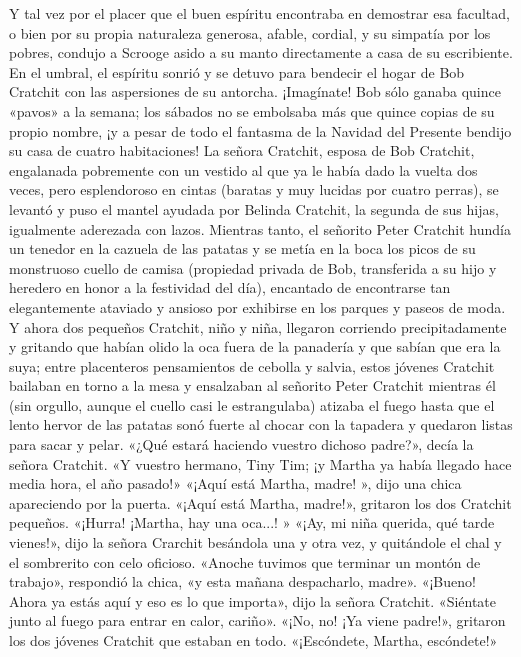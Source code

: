 \documentclass{novela}
\begin{document}
 Y tal vez por el placer que el buen espíritu encontraba en demostrar esa facultad, o bien por su propia naturaleza generosa, afable, cordial, y su simpatía por los pobres, condujo a Scrooge asido a su manto directamente a casa de su escribiente. En el umbral, el espíritu sonrió y se detuvo para bendecir el hogar de Bob Cratchit con las aspersiones de su antorcha. ¡Imagínate! Bob sólo ganaba quince «pavos» a la semana; los sábados no se embolsaba más que quince copias de su propio nombre, ¡y a pesar de todo el fantasma de la Navidad del Presente bendijo su casa de cuatro habitaciones!
 La señora Cratchit, esposa de Bob Cratchit, engalanada pobremente con un vestido al que ya le había dado la vuelta dos veces, pero esplendoroso en cintas (baratas y muy lucidas por cuatro perras), se levantó y puso el mantel ayudada por Belinda Cratchit, la segunda de sus hijas, igualmente aderezada con lazos. Mientras tanto, el señorito Peter Cratchit hundía un tenedor en la cazuela de las patatas y se metía en la boca los picos de su monstruoso cuello de camisa (propiedad privada de Bob, transferida a su hijo y heredero en honor a la festividad del día), encantado de encontrarse tan elegantemente ataviado y ansioso por exhibirse en los parques y paseos de moda. Y ahora dos pequeños Cratchit, niño y niña, llegaron corriendo precipitadamente y gritando que habían olido la oca fuera de la panadería y que sabían que era la suya; entre placenteros pensamientos de cebolla y salvia, estos jóvenes Cratchit bailaban en torno a la mesa y ensalzaban al señorito Peter Cratchit mientras él (sin orgullo, aunque el cuello casi le estrangulaba) atizaba el fuego hasta que el lento hervor de las patatas sonó fuerte al chocar con la tapadera y quedaron listas para sacar y pelar.
 «¿Qué estará haciendo vuestro dichoso padre?», decía la señora Cratchit. «Y vuestro hermano, Tiny Tim; ¡y Martha ya había llegado hace media hora, el año pasado!»
 «¡Aquí está Martha, madre! », dijo una chica apareciendo por la puerta.
 «¡Aquí está Martha, madre!», gritaron los dos Cratchit pequeños. «¡Hurra! ¡Martha, hay una oca...! »
 «¡Ay, mi niña querida, qué tarde vienes!», dijo la señora Crarchit besándola una y otra vez, y quitándole el chal y el sombrerito con celo oficioso.
 «Anoche tuvimos que terminar un montón de trabajo», respondió la chica, «y esta mañana despacharlo, madre». «¡Bueno! Ahora ya estás aquí y eso es lo que importa», dijo la señora Cratchit. «Siéntate junto al fuego para entrar en calor, cariño».
 «¡No, no! ¡Ya viene padre!», gritaron los dos jóvenes Cratchit que estaban en todo. «¡Escóndete, Martha, escóndete!»
\end{document}
